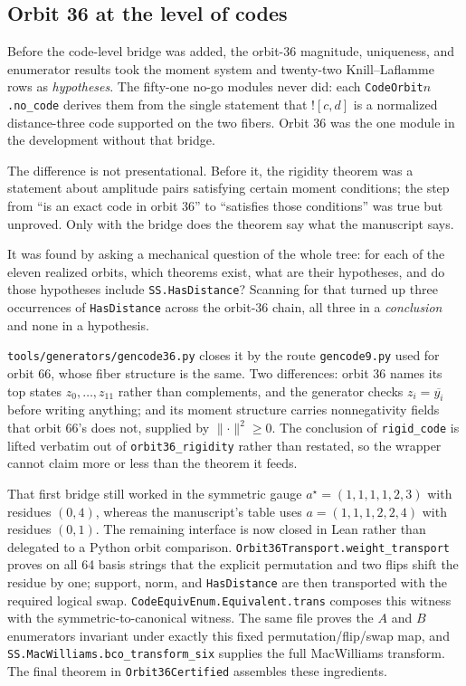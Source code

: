 \documentclass[11pt,a4paper]{article}
\newcommand{\lean}[1]{\texttt{#1}}
\theoremstyle{definition}
\begin{document}
\subsection{Orbit 36 at the level of codes}

Before the code-level bridge was added, the orbit-36 magnitude, uniqueness, and
enumerator results took the moment system and twenty-two Knill--Laflamme rows as
\emph{hypotheses}. The fifty-one no-go
modules never did: each \lean{CodeOrbit$n$.no\_code} derives them from the
single statement that $![c,d]$ is a normalized distance-three code supported on
the two fibers. Orbit 36 was the one module in the development without that
bridge.

The difference is not presentational. Before it, the rigidity theorem was a
statement about amplitude pairs satisfying certain moment conditions; the step
from ``is an exact code in orbit 36'' to ``satisfies those conditions'' was true
but unproved. Only with the bridge does the theorem say what the manuscript
says.

It was found by asking a mechanical question of the whole tree: for each of the
eleven realized orbits, which theorems exist, what are their hypotheses, and do
those hypotheses include \lean{SS.HasDistance}? Scanning for that turned up
three occurrences of \lean{HasDistance} across the orbit-36 chain, all three in
a \emph{conclusion} and none in a hypothesis.

\lean{tools/generators/gencode36.py} closes it by the route
\lean{gencode9.py} used for orbit 66, whose fiber structure is the same. Two
differences: orbit 36 names its top states $z_0,\ldots,z_{11}$ rather than
complements, and the generator checks $z_i=\overline{y_i}$ before writing
anything; and its moment structure carries nonnegativity fields that orbit 66's
does not, supplied by $\lVert\cdot\rVert^2\ge0$. The conclusion of
\lean{rigid\_code} is lifted verbatim out of \lean{orbit36\_rigidity} rather
than restated, so the wrapper cannot claim more or less than the theorem it
feeds.

That first bridge still worked in the symmetric gauge
$a^\star=(1,1,1,1,2,3)$ with residues $(0,4)$, whereas the manuscript's table
uses $a=(1,1,1,2,2,4)$ with residues $(0,1)$.  The remaining interface is now
closed in Lean rather than delegated to a Python orbit comparison.
\lean{Orbit36Transport.weight\_transport} proves on all 64 basis strings that
the explicit permutation and two flips shift the residue by one; support,
norm, and \lean{HasDistance} are then transported with the required logical
swap. \lean{CodeEquivEnum.Equivalent.trans} composes this witness with the
symmetric-to-canonical witness.  The same file proves the $A$ and $B$
enumerators invariant under exactly this fixed permutation/flip/swap map, and
\lean{SS.MacWilliams.bco\_transform\_six} supplies the full MacWilliams
transform.  The final theorem in \lean{Orbit36Certified} assembles these
ingredients.
\end{document}
